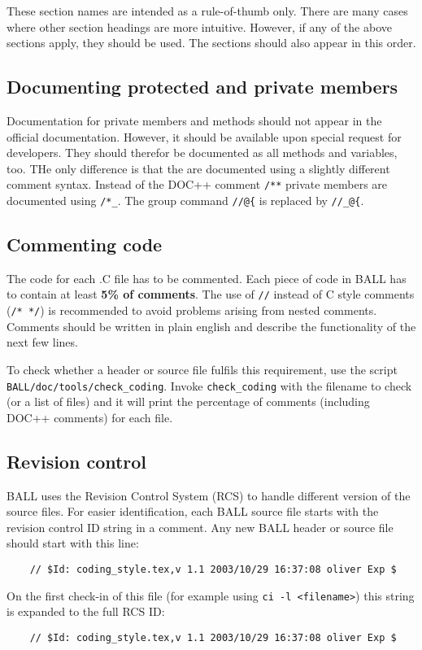 \documentclass[a4]{article}
\begin{document}
These section names are intended as a rule-of-thumb only. There are many cases
where other section headings are more intuitive. However, if any of the above
sections apply, they should be used. The sections should also appear in this
order.


\subsection{Documenting protected and private members}

Documentation for private members and methods should not appear in the
official documentation. However, it should be available upon special request
for developers. They should therefor be documented as all methods and
variables, too. THe only difference is that the are documented using a
slightly different comment syntax. Instead of the DOC++ comment {\tt /**}
private members are documented using {\tt /*\_}. The group command {\tt //@\{}
is replaced by {\tt //\_@\{}.\\


\subsection{Commenting code}

The code for each .C file has to be commented. Each piece of code in BALL has
to contain at least {\bf 5\% of comments}. The use of {\tt //} instead of C style
comments ({\tt /* */}) is recommended to avoid problems arising from nested
comments. Comments should be written in plain english and describe the
functionality of the next few lines.

To check whether a header or source file fulfils this requirement, use the
script {\tt BALL/doc/tools/check\_coding}. Invoke {\tt check\_coding} with the
filename to check (or a list of files) and it will print the percentage of
comments (including DOC++ comments) for each file.


\subsection{Revision control}

BALL uses the Revision Control System (RCS) to handle different version of the
source files. For easier identification, each BALL source file starts with the
revision control ID string in a comment. Any new BALL header or source file
should start with this line:
\begin{verbatim}
	// $Id: coding_style.tex,v 1.1 2003/10/29 16:37:08 oliver Exp $
\end{verbatim}
On the first check-in of this file (for example using {\tt ci -l
<filename>}) this string is expanded to the full RCS ID:
\begin{verbatim}
	// $Id: coding_style.tex,v 1.1 2003/10/29 16:37:08 oliver Exp $ 
\end{verbatim}
\end{document}
